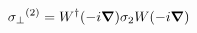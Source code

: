 \begin{equation}
{\sigma_{\perp}}^{(2)} = W^{\dag} (-i \mbox{\boldmath $\nabla$}) \sigma_{2} W (-i \mbox{\boldmath $\nabla$}) 
\end{equation}

